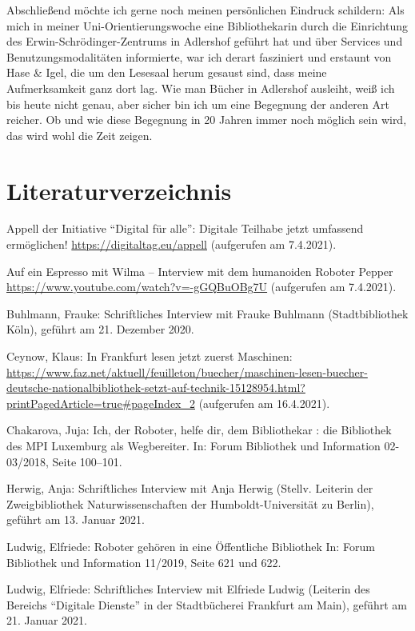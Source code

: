 \documentclass[a4paper,
fontsize=11pt,
oneside,
numbers=noperiodatend,
parskip=half-,
bibliography=totoc,
final
]{scrartcl}
\begin{document}
Abschließend möchte ich gerne noch meinen persönlichen Eindruck
schildern: Als mich in meiner Uni-Orientierungswoche eine Bibliothekarin
durch die Einrichtung des Erwin-Schrödinger-Zentrums in Adlershof
geführt hat und über Services und Benutzungsmodalitäten informierte, war
ich derart fasziniert und erstaunt von Hase \& Igel, die um den Lesesaal
herum gesaust sind, dass meine Aufmerksamkeit ganz dort lag. Wie man
Bücher in Adlershof ausleiht, weiß ich bis heute nicht genau, aber
sicher bin ich um eine Begegnung der anderen Art reicher. Ob und wie
diese Begegnung in 20 Jahren immer noch möglich sein wird, das wird wohl
die Zeit zeigen.

\hypertarget{literaturverzeichnis}{%
\section{Literaturverzeichnis}\label{literaturverzeichnis}}

Appell der Initiative \enquote{Digital für alle}: Digitale Teilhabe
jetzt umfassend ermöglichen! \url{https://digitaltag.eu/appell}
(aufgerufen am 7.4.2021).

Auf ein Espresso mit Wilma -- Interview mit dem humanoiden Roboter
Pepper \url{https://www.youtube.com/watch?v=-gGQBuOBg7U} (aufgerufen am
7.4.2021).

Buhlmann, Frauke: Schriftliches Interview mit Frauke Buhlmann
(Stadtbibliothek Köln), geführt am 21. Dezember 2020.

Ceynow, Klaus: In Frankfurt lesen jetzt zuerst Maschinen:
\url{https://www.faz.net/aktuell/feuilleton/buecher/maschinen-lesen-buecher-deutsche-nationalbibliothek-setzt-auf-technik-15128954.html?printPagedArticle=true\#pageIndex_2}
(aufgerufen am 16.4.2021).

Chakarova, Juja: Ich, der Roboter, helfe dir, dem Bibliothekar : die
Bibliothek des MPI Luxemburg als Wegbereiter. In: Forum Bibliothek und
Information 02-03/2018, Seite 100--101.

Herwig, Anja: Schriftliches Interview mit Anja Herwig (Stellv. Leiterin
der Zweigbibliothek Naturwissenschaften der Humboldt-Universität zu
Berlin), geführt am 13. Januar 2021.

Ludwig, Elfriede: Roboter gehören in eine Öffentliche Bibliothek In:
Forum Bibliothek und Information 11/2019, Seite 621 und 622.

Ludwig, Elfriede: Schriftliches Interview mit Elfriede Ludwig (Leiterin
des Bereichs \enquote{Digitale Dienste} in der Stadtbücherei Frankfurt am Main),
geführt am 21. Januar 2021.
\end{document}
